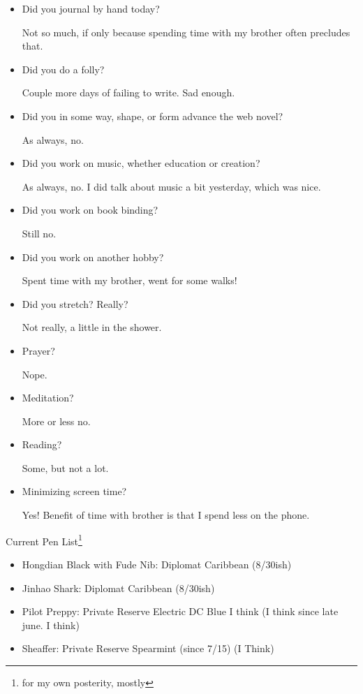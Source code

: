 \documentclass[12pt]{article}
\renewcommand{\,}{\textsuperscript{,}}
\begin{document}
\begin{itemize}

\item Did you journal by hand today?

Not so much, if only because spending time with my brother often precludes that.

\item Did you do a folly?

Couple more days of failing to write. Sad enough.

\item Did you in some way, shape, or form advance the web novel?

As always, no.

\item Did you work on music, whether education or creation?

As always, no.
I did talk about music a bit yesterday, which was nice.

\item Did you work on book binding?

Still no.

\item Did you work on another hobby?

Spent time with my brother, went for some walks!

\item Did you stretch? Really?

Not really, a little in the shower.

\item Prayer?

Nope.

\item Meditation?

More or less no.

\item Reading?

Some, but not a lot.

\item Minimizing screen time?

Yes! 
Benefit of time with brother is that I spend less on the phone.
\end{itemize}

Current Pen List\footnote{for my own posterity, mostly}

\begin{itemize}  
\item Hongdian Black with Fude Nib: Diplomat Caribbean (8/30ish)  
\item Jinhao Shark: Diplomat Caribbean (8/30ish)  
\item Pilot Preppy: Private Reserve Electric DC Blue I think (I think since late june. I think)  
\item Sheaffer: Private Reserve Spearmint (since 7/15) (I Think)
\end{itemize}
\end{document}
